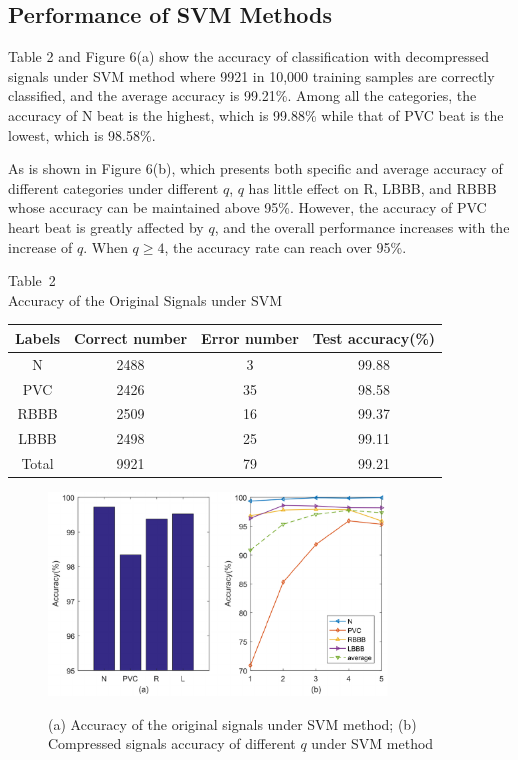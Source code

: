\documentclass[journal]{IEEEtran}
\begin{document}
\subsection{Performance of SVM Methods}
Table 2 and Figure 6(a) show the accuracy of classification with decompressed signals under SVM method where 9921 in 10,000 training samples are correctly classified, and the average accuracy is 99.21\%. Among all the categories, the accuracy of N beat is the highest, which is 99.88\% while that of PVC beat is the lowest, which is 98.58\%.

As is shown in Figure 6(b), which presents both specific and average accuracy of different categories under different $q$, $q$ has little effect on R, LBBB, and RBBB whose accuracy can be maintained above 95\%. However, the accuracy of PVC heart beat is greatly affected by $q$, and the overall performance increases with the increase of $q$. When $q\geq4$, the accuracy rate can reach over 95\%.

\begin{center}
	\scriptsize
	{ Table~2\\ Accuracy of the Original Signals under SVM }\\
	\label{tab:2} \vskip 3pt
	\newcommand{\rb}[1]{\raisebox{1.9ex}[-2pt]{#1}}
	\begin{tabular}{c|cc|c}
		\toprule
Labels & Correct number & Error number & Test accuracy(\%)   \\
		\midrule
		N    & 2488  & 3  & 99.88  \\
		PVC  & 2426  & 35 & 98.58  \\
		RBBB & 2509  & 16 & 99.37  \\
		LBBB & 2498  & 25 & 99.11  \\
		\midrule
		Total& 9921  & 79 & 99.21  \\
		\bottomrule
	\end{tabular}
\end{center}

\begin{figure}
	\centering
	\includegraphics[width=9cm]{SVMAccuracy3.pdf}\\
	\caption{(a) Accuracy of the original signals under SVM method; (b) Compressed signals accuracy of different $q$ under SVM method}
	\label{SVMAccuracy1}
\end{figure}
\end{document}
